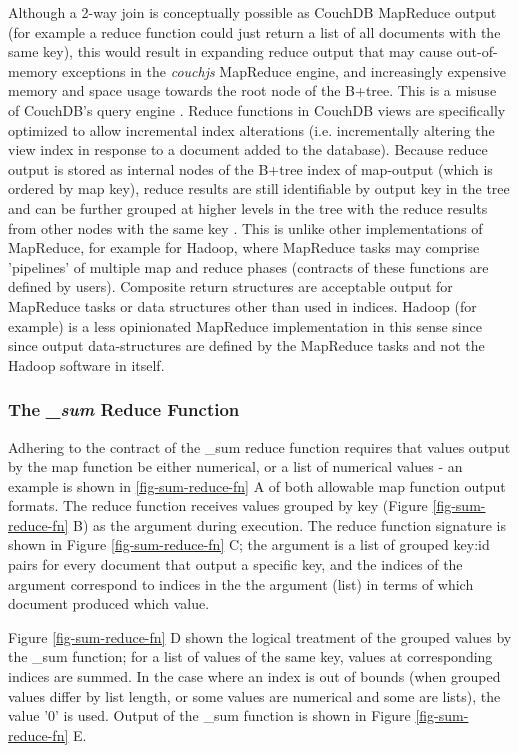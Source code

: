 Although a 2-way join is conceptually possible as CouchDB MapReduce output (for example a reduce function could just return a list of all documents with the same key), this would result in expanding reduce output that may cause out-of-memory exceptions in the \textit{couchjs} MapReduce engine, and increasingly expensive memory and space usage towards the root node of the B+tree. This is a misuse of CouchDB's query engine \cite{reduceFunctions}. Reduce functions in CouchDB views are specifically optimized to allow incremental index alterations (i.e. incrementally altering the view index in response to a document added to the database). Because reduce output is stored as internal nodes of the B+tree index of map-output (which is ordered by map key), reduce results are still identifiable by output key in the tree and can be further grouped at higher levels in the tree with the reduce results from other nodes with the same key \cite{slack25Oct}. This is unlike other implementations of MapReduce, for example for Hadoop, where MapReduce tasks may comprise 'pipelines' of multiple map and reduce phases (contracts of these functions are defined by users). Composite return structures are acceptable output for MapReduce tasks or data structures other than used in indices. Hadoop (for example) is a less opinionated MapReduce implementation in this sense since since output data-structures are defined by the MapReduce tasks and not the Hadoop software in itself.

\subsubsection{The \textit{\_sum} Reduce Function}
Adhering to the contract of the \_sum reduce function requires that values output by the map function be either numerical, or a list of numerical values - an example is shown in \ref{fig-sum-reduce-fn} A of both allowable map function output formats. The reduce function receives values grouped by key (Figure \ref{fig-sum-reduce-fn} B) as the  argument during execution. The reduce function signature is shown in Figure \ref{fig-sum-reduce-fn} C; the  argument is a list of grouped key:id pairs for every document that output a specific key, and the indices of the  argument correspond to indices in the the  argument (list) in terms of which document produced which value.

Figure \ref{fig-sum-reduce-fn} D shown the logical treatment of the grouped values by the \_sum function; for a list of values of the same key, values at corresponding indices are summed. In the case where an index is out of bounds (when grouped values differ by list length, or some values are numerical and some are lists), the value '0' is used. Output of the \_sum function is shown in Figure \ref{fig-sum-reduce-fn} E.

